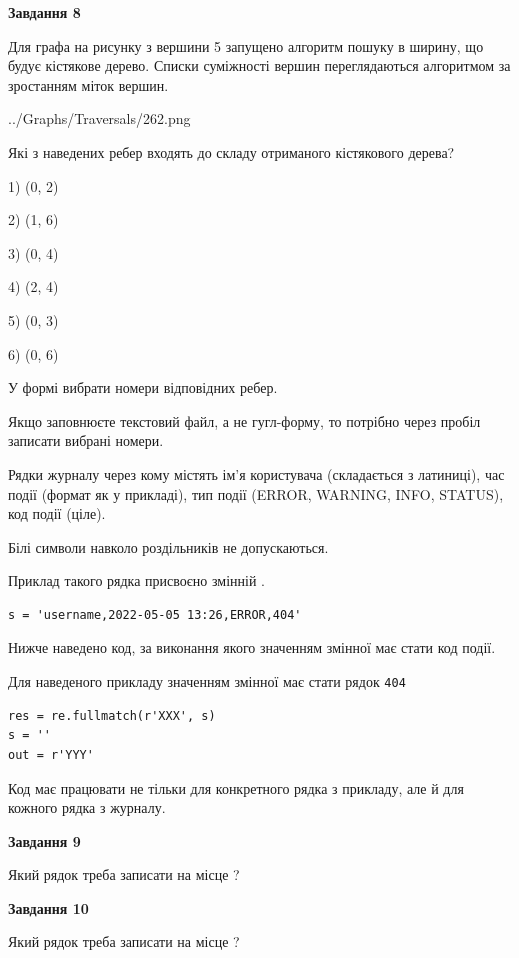 \documentclass[12pt, ukrainian]{article}
\def\code#1{\Verb!#1!}
\begin{document}
{\begin {large}
{\begin {center}\textbf{Завдання 8}\end {center}}\par
Для графа на рисунку з вершини 5 запущено алгоритм пошуку в ширину, що будує кістякове дерево. Списки суміжності вершин переглядаються алгоритмом за зростанням міток вершин.\par
\begin{center}
	{../Graphs/Traversals/262.png}
\end{center}
\par Які з наведених ребер входять до складу отриманого кістякового дерева?\par
1) (0, 2)\par
2) (1, 6)\par
3) (0, 4)\par
4) (2, 4)\par
5) (0, 3)\par
6) (0, 6)\par
{\vskip 15pt} У формі вибрати номери відповідних ребер.


Якщо заповнюєте текстовий файл, а не гугл-форму, то потрібно через пробіл записа\-ти вибрані номери.\par
\newpage


Рядки журналу через кому містять ім'я користувача (складається з латиниці), час події (фор\-мат як у прикладі), тип події (ERROR, WARNING, INFO, STATUS), код події (ціле).

Білі символи навколо роздільників не допускаються.

Приклад такого рядка присвоєно змінній .



\begin{verbatim}
s = 'username,2022-05-05 13:26,ERROR,404'
\end{verbatim}


Нижче наведено код, за виконання якого значенням змінної  має стати код події.

Для наведеного прикладу значенням змінної  має стати рядок \code{404}



\begin{verbatim}
res = re.fullmatch(r'XXX', s)
s = ''
out = r'YYY'
\end{verbatim}


Код має працювати не тільки для конкретного рядка з прикладу, але й для кожного рядка з журналу.

{\begin {center}\textbf{Завдання 9}\end {center}}\par
Який рядок треба записати на місце  ?\par
\vspace{5mm}


{\begin {center}\textbf{Завдання 10}\end {center}}\par
Який рядок треба записати на місце  ?\par


\newpage


\end {large}}
\end{document}
